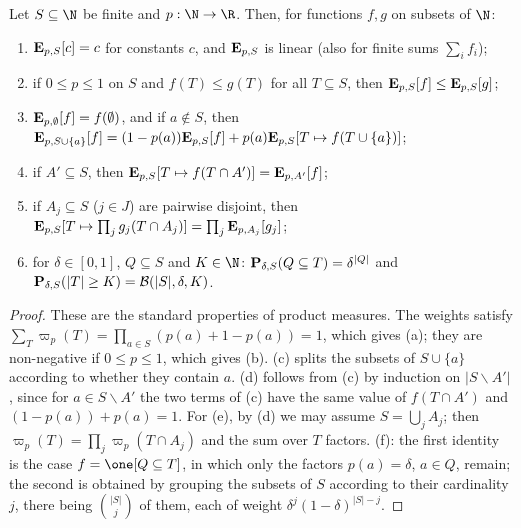 \begin{lemma}\label{pf:top-supply:expect}
Let $S\subseteq\N$ be finite and $p:\N\to\R$. Then, for functions $f,g$ on subsets of $\N$:
\begin{enumerate}[label=(\alph*)]
\item $\mathbf{E}_{p,S}[c]=c$ for constants $c$, and $\mathbf{E}_{p,S}$ is linear (also for finite sums $\sum_if_i$);
\item if $0\le p\le1$ on $S$ and $f(T)\le g(T)$ for all $T\subseteq S$, then $\mathbf{E}_{p,S}[f]\le\mathbf{E}_{p,S}[g]$;
\item $\mathbf{E}_{p,\emptyset}[f]=f(\emptyset)$, and if $a\notin S$, then
$\mathbf{E}_{p,S\cup\{a\}}[f]=(1-p(a))\mathbf{E}_{p,S}[f]+p(a)\mathbf{E}_{p,S}[T\mapsto f(T\cup\{a\})]$;
\item if $A'\subseteq S$, then $\mathbf{E}_{p,S}[T\mapsto f(T\cap A')]=\mathbf{E}_{p,A'}[f]$;
\item if $A_j\subseteq S$ ($j\in J$) are pairwise disjoint, then
$\mathbf{E}_{p,S}[T\mapsto\prod_jg_j(T\cap A_j)]=\prod_j\mathbf{E}_{p,A_j}[g_j]$;
\item for $\delta\in[0,1]$, $Q\subseteq S$ and $K\in\N$: $\mathbf{P}_{\delta,S}(Q\subseteq T)=\delta^{|Q|}$ and
$\mathbf{P}_{\delta,S}(|T|\ge K)=\mathcal{B}(|S|,\delta,K)$.
\end{enumerate}
 
 
 
 
\end{lemma}

\begin{proof}
These are the standard properties of product measures. The weights satisfy $\sum_T\varpi_p(T)=\prod_{a\in S}(p(a)+1-p(a))=1$,
which gives (a); they are non-negative if $0\le p\le1$, which gives (b). (c) splits the subsets of $S\cup\{a\}$ according to
whether they contain $a$. (d) follows from (c) by induction on $|S\smallsetminus A'|$, since for $a\in S\smallsetminus A'$
the two terms of (c) have the same value of $f(T\cap A')$ and $(1-p(a))+p(a)=1$. For (e), by (d) we may assume
$S=\bigcup_jA_j$; then $\varpi_p(T)=\prod_j\varpi_p(T\cap A_j)$ and the sum over $T$ factors. (f): the first identity is the
case $f=\one[Q\subseteq T]$, in which only the factors $p(a)=\delta$, $a\in Q$, remain; the second is obtained by grouping
the subsets of $S$ according to their cardinality $j$, there being $\binom{|S|}j$ of them, each of weight
$\delta^j(1-\delta)^{|S|-j}$.
\end{proof}

